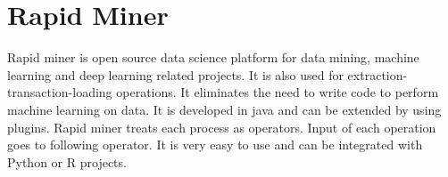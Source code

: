 \section{Rapid Miner}

Rapid miner is open source data science platform for data mining, machine
learning and deep learning related projects. It is also used for
extraction-transaction-loading operations. It eliminates the need to write code
to perform machine learning on data. It is developed in java and can be extended
 by using plugins.
Rapid miner treats each process as operators. Input of each operation goes to
following operator. It is very easy to use and can be integrated with Python or
R projects.~\cite{hid-sp18-502-RapidMiner}



